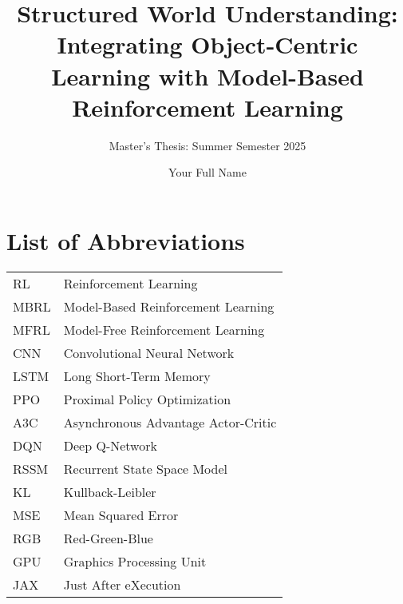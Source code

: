 \documentclass[
	english,
	ruledheaders=section,
	class=report,
	thesis={type=master},
	accentcolor=9c,
	custommargins=true,
	marginpar=false,
	parskip=half-,
	fontsize=11pt,
]{tudapub}
\begin{document}

\title{Structured World Understanding: Integrating Object-Centric Learning with Model-Based Reinforcement Learning}
\subtitle{Master's Thesis: Summer Semester 2025}
\author[Y. Name]{Your Full Name}



\maketitle

\affidavit

\tableofcontents
\listoffigures
\listoftables

\chapter*{List of Abbreviations}
\begin{tabular}{ll}
	RL   & Reinforcement Learning              \\
	MBRL & Model-Based Reinforcement Learning  \\
	MFRL & Model-Free Reinforcement Learning   \\
	CNN  & Convolutional Neural Network        \\
	LSTM & Long Short-Term Memory              \\
	PPO  & Proximal Policy Optimization        \\
	A3C  & Asynchronous Advantage Actor-Critic \\
	DQN  & Deep Q-Network                      \\
	RSSM & Recurrent State Space Model         \\
	KL   & Kullback-Leibler                    \\
	MSE  & Mean Squared Error                  \\
	RGB  & Red-Green-Blue                      \\
	GPU  & Graphics Processing Unit            \\
	JAX  & Just After eXecution                \\
\end{tabular}
\end{document}
